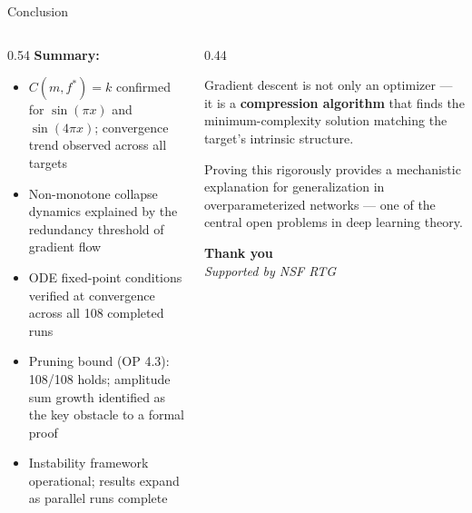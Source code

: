 \documentclass[aspectratio=169, 10pt]{beamer}
\newcommand{\fstar}{f^\ast}
\begin{document}
\begin{frame}{Conclusion}
  \begin{columns}[T]
    \begin{column}{0.54\textwidth}
      \small
      \textbf{Summary:}
      \begin{itemize}
        \item $C(m,\fstar)=k$ confirmed for $\sin(\pi x)$
              and $\sin(4\pi x)$; convergence trend observed
              across all targets
        \item Non-monotone collapse dynamics explained
              by the redundancy threshold of gradient flow
        \item ODE fixed-point conditions verified at
              convergence across all 108 completed runs
        \item Pruning bound (OP 4.3): 108/108 holds;
              amplitude sum growth identified as the
              key obstacle to a formal proof
        \item Instability framework operational;
              results expand as parallel runs complete
      \end{itemize}
    \end{column}
    \begin{column}{0.44\textwidth}
      \begin{tcolorbox}[colback=aunavy!8, colframe=aunavy,
                        title={\normalsize\textbf{Broader implication}},
                        top=5pt, bottom=5pt, left=5pt, right=5pt]
        \small
        Gradient descent is not only an optimizer —
        it is a \textbf{compression algorithm} that
        finds the minimum-complexity solution
        matching the target's intrinsic structure.

        \vspace{0.4em}
        Proving this rigorously provides a
        mechanistic explanation for generalization
        in overparameterized networks — one of the
        central open problems in deep learning theory.
      \end{tcolorbox}
      \vspace{0.7em}
      \begin{center}
        \large\textbf{Thank you}\\
        \vspace{0.3em}
        \small\textit{Supported by NSF RTG}
      \end{center}
    \end{column}
  \end{columns}
\end{frame}
\end{document}
